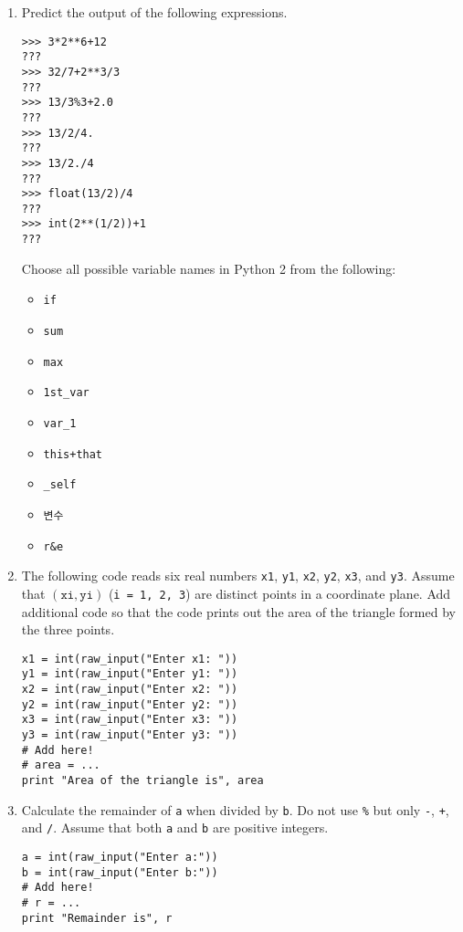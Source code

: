 \documentclass[../main.tex]{subfiles}
\begin{document}
\begin{enumerate}
\item Predict the output of the following expressions.
\begin{verbatim}
>>> 3*2**6+12
???
>>> 32/7+2**3/3
???
>>> 13/3%3+2.0
???
>>> 13/2/4.
???
>>> 13/2./4
???
>>> float(13/2)/4
???
>>> int(2**(1/2))+1
???
\end{verbatim}
Choose all possible variable names in Python 2 from the following:
\begin{itemize}
\item \texttt{if}
\item \texttt{sum}
\item \texttt{max}
\item \texttt{1st\_var}
\item \texttt{var\_1}
\item \texttt{this+that}
\item \texttt{\_self}
\item \texttt{변수}
\item \texttt{r\&e}
\end{itemize}

\item The following code reads six real numbers \texttt{x1}, \texttt{y1}, \texttt{x2}, \texttt{y2}, \texttt{x3}, and \texttt{y3}.
Assume that $(\texttt{xi}, \texttt{yi})$ (\texttt{i = 1, 2, 3}) are distinct points in a coordinate plane.
Add additional code so that the code prints out the area of the triangle formed by the three points.
\begin{verbatim}
x1 = int(raw_input("Enter x1: "))
y1 = int(raw_input("Enter y1: "))
x2 = int(raw_input("Enter x2: "))
y2 = int(raw_input("Enter y2: "))
x3 = int(raw_input("Enter x3: "))
y3 = int(raw_input("Enter y3: "))
# Add here!
# area = ...
print "Area of the triangle is", area
\end{verbatim}

\item Calculate the remainder of \texttt{a} when divided by \texttt{b}.
Do not use \texttt{\%} but only \texttt{-}, \texttt{+}, and \texttt{/}.
Assume that both \texttt{a} and \texttt{b} are positive integers.
\begin{verbatim}
a = int(raw_input("Enter a:"))
b = int(raw_input("Enter b:"))
# Add here!
# r = ...
print "Remainder is", r
\end{verbatim}


\end{enumerate}
\end{document}
